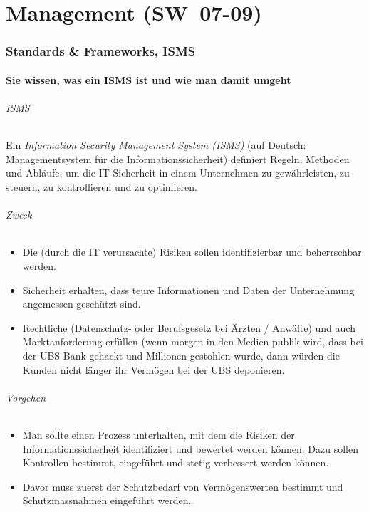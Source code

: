 \documentclass[10pt,a4paper]{article}
\begin{document}
\pagebreak
\part{Management (SW~07-09)}
\section{Standards \& Frameworks, ISMS}
\subsection*{Sie wissen, was ein ISMS ist und wie man damit umgeht}
\paragraph*{ISMS}Ein \textsl{Information Security Management System (ISMS)} (auf Deutsch: Managementsystem für die Informationssicherheit) definiert Regeln, Methoden und Abläufe, um die IT-Sicherheit in einem Unternehmen zu gewährleisten, zu steuern, zu kontrollieren und zu optimieren.

\paragraph*{Zweck}
\begin{itemize}[noitemsep,topsep=0pt,leftmargin=*]
    \item Die (durch die IT verursachte) Risiken sollen identifizierbar und beherrschbar werden.
    \item Sicherheit erhalten, dass teure Informationen und Daten der Unternehmung angemessen geschützt sind.
    \item Rechtliche (Datenschutz- oder Berufsgesetz bei Ärzten / Anwälte) und auch Marktanforderung erfüllen (wenn morgen in den Medien publik wird, dass bei der UBS Bank gehackt und Millionen gestohlen wurde, dann würden die Kunden nicht länger ihr Vermögen bei der UBS deponieren.
\end{itemize}

\paragraph*{Vorgehen}
\begin{itemize}[noitemsep,topsep=0pt,leftmargin=*]
    \item Man sollte einen Prozess unterhalten, mit dem die Risiken der Informationssicherheit identifiziert und bewertet werden können. Dazu sollen Kontrollen bestimmt, eingeführt und stetig verbessert werden können.
    \item Davor muss zuerst der Schutzbedarf von Vermögenswerten bestimmt und Schutzmassnahmen eingeführt werden.
\end{itemize}
\end{document}
